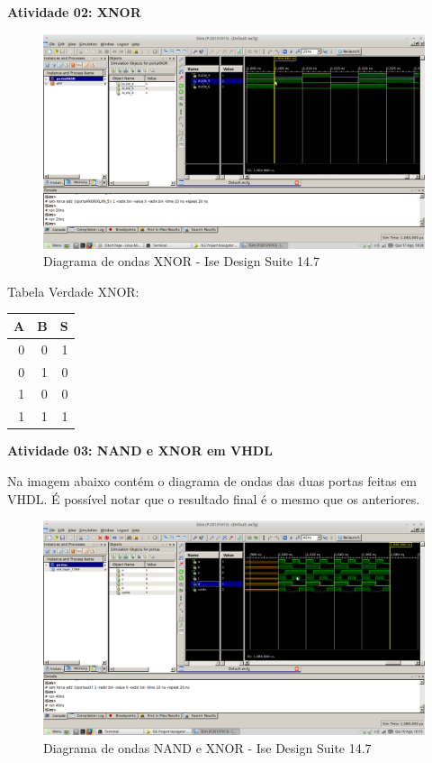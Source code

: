 \documentclass[12pts]{article}
\begin{document}
\newpage
\textbf{Atividade 02: XNOR}

\begin{figure}[!htb]
  \centering
  \includegraphics[scale=0.3]{Atividade02}
  \caption{Diagrama de ondas XNOR - Ise Design Suite 14.7}
  \label{figRotulo}
\end{figure}
\singlespacing

Tabela Verdade XNOR:

\begin{center}
	\begin{tabular}{|r|r|r|}
		\hline
		A & B & S\\
		\hline
		0 & 0 & 1\\
		\hline
		0 & 1 & 0\\
		\hline
		1 & 0 & 0\\
		\hline
		1 & 1 & 1\\
		\hline
	\end{tabular}
\end{center}

\newpage
\textbf{Atividade 03: NAND e XNOR em VHDL}
\singlespacing

	Na imagem abaixo contém o diagrama de ondas das duas portas feitas em VHDL. É possível notar que o resultado final é o mesmo que os anteriores.

\begin{figure}[!htb]
  \centering
  \includegraphics[scale=0.3]{Atividade03}
  \caption{Diagrama de ondas NAND e XNOR - Ise Design Suite 14.7}
  \label{figRotulo}
\end{figure}
\end{document}
